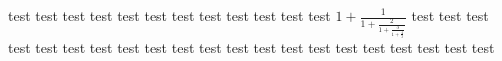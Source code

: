 \documentclass{jsarticle}
\begin{document}
test test test
test test test
test test test
test test test
$1+\frac{1}{1+\frac2{1+\frac3{1+\frac43}}}$
test test test
test test test
test test test
test test test
test test test
test test test
test test test
\end{document}
